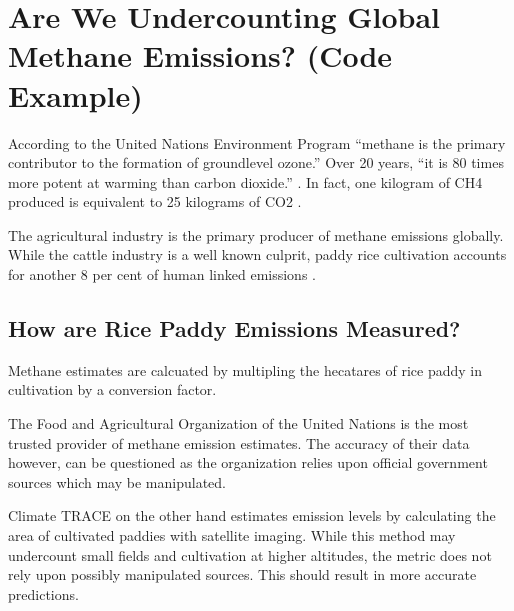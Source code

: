 \documentclass[letterpaper,10pt,english]{jupyterBook}
\begin{document}
\sphinxstepscope


\chapter{Are We Undercounting Global Methane Emissions? (Code Example)}
\label{\detokenize{notebooks/full_post:are-we-undercounting-global-methane-emissions-code-example}}\label{\detokenize{notebooks/full_post::doc}}
\sphinxAtStartPar
According to the United Nations Environment Program “methane is the primary contributor to the formation of ground\sphinxhyphen{}level ozone.” Over 20 years, “it is 80 times more potent at warming than carbon dioxide.” .  In fact, one kilogram of CH4 produced is equivalent to 25 kilograms of CO2 .

\sphinxAtStartPar
The agricultural industry is the primary producer of methane emissions globally.  While the cattle industry is a well known culprit, paddy rice cultivation accounts for another 8 per cent of human linked emissions .


\section{How are Rice Paddy Emissions Measured?}
\label{\detokenize{notebooks/full_post:how-are-rice-paddy-emissions-measured}}
\sphinxAtStartPar
Methane estimates are calcuated by multipling the hecatares of rice paddy in cultivation by a conversion factor.

\sphinxAtStartPar
The Food and Agricultural Organization of the United Nations  is the most trusted provider of methane emission estimates.  The accuracy of their data however, can be questioned as the organization relies upon official government sources which may be manipulated.

\sphinxAtStartPar
Climate TRACE  on the other hand estimates emission levels by calculating the area of cultivated paddies with satellite imaging.   While this method may undercount small fields and cultivation at higher altitudes, the metric does not rely upon possibly manipulated sources. This should result in more accurate predictions.
\end{document}
